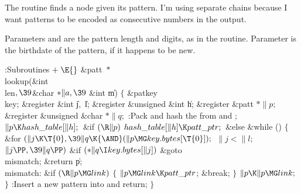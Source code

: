 The  routine finds a node given its
pattern.
I'm using separate chains because I want patterns to be encoded as consecutive
numbers in the output.

Parameters  and  are the pattern length and digits, as in
the
 routine. Parameter  is the birthdate of the
pattern, if it
happens to be new.

\Y\B\4:Subroutines\X${}\mathrel+\E{}$\6
\&{patt} ${}{*}{}$\\{lookup}(\&{int} \\{len}${},\39{}$\&{char} ${}{*}\|a,\39{}$%
\&{int} \|m)\1\1\2\2\6
${}\{{}$\1\6
\&{patkey} \\{key};\6
\&{register} \&{int} \|j${},{}$ \|l;\6
\&{register} \&{unsigned} \&{int} \|h;\6
\&{register} \&{patt} ${}{*}\|p;{}$\6
\&{register} \&{unsigned} \&{char} ${}{*}\|q;{}$\7
:Pack and hash the  from  and \X;\6
${}\|p\K\\{hash\_table}[\|h];{}$\6
\&{if} ${}(\R\|p){}$\1\5
${}\\{hash\_table}[\|h]\K\\{patt\_ptr};{}$\2\6
\&{else}\5
\1\&{while} ()\5
${}\{{}$\1\6
\&{for} ${}(\|j\K\T{0},\39\|q\K{\AND}(\|p\MG\\{key}.\\{bytes}[\T{0}]);{}$ ${}%
\|j<\|l;{}$ ${}\|j\PP,\39\|q\PP){}$\1\6
\&{if} ${}({*}\|q\I\\{key}.\\{bytes}[\|j]){}$\1\5
\&{goto} \\{mismatch};\2\2\6
\&{return} \|p;\6
\4\\{mismatch}:\5
\&{if} ${}(\R\|p\MG\\{link}){}$\5
${}\{{}$\1\6
${}\|p\MG\\{link}\K\\{patt\_ptr}{}$;\5
\&{break};\6
\4${}\}{}$\2\6
${}\|p\K\|p\MG\\{link};{}$\6
\4${}\}{}$\2\2\6
:Insert a new pattern into  and return\X;\6
\4${}\}{}$\2\par
\fi

